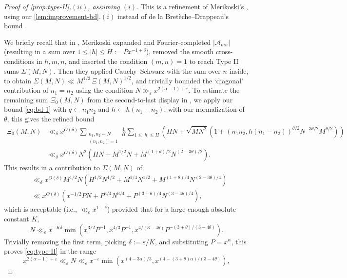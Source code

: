 \documentclass[reqno,11pt]{amsart}
\theoremstyle{remark}
\numberwithin{equation}{section}
\newcommand{\mA}{\mathcal{A}}
\newcommand{\eps}{\varepsilon}
\begin{document}
\begin{proof}[Proof of \cref{prop:type-II}.$(ii)$, assuming $(i)$]
This is a refinement of Merikoski's \cite[Prop.\,4.(ii)]{merikoski2023largest}, using our \cref{lem:improvement-bd}.$(i)$ instead of de la Bret\`eche--Drappeau's bound \cite[(8.5)]{de2020niveau}.

We briefly recall that in \cite[\S 3]{merikoski2023largest}, Merikoski expanded and Fourier-completed $|\mA_{mn}|$ (resulting in a sum over $1 \le |h| \le H := P x^{-1+\delta}$), removed the smooth cross-conditions in $h, m, n$, and inserted the condition $(m, n) = 1$ to reach Type II sums $\Sigma(M, N)$. Then they applied Cauchy--Schwarz with the sum over $n$ inside, to obtain $\Sigma(M, N) \ll M^{1/2}\, \Xi(M, N)^{1/2}$, and trivially bounded the `diagonal' contribution of $n_1 = n_2$ using the condition $N \gg_\eps x^{2(\alpha-1)+\eps}$. To estimate the remaining sum $\Xi_0(M, N)$ from the second-to-last display in \cite[\S 3.10]{merikoski2023largest}, we apply our bound \cref{eq:bd-1} with $q \gets n_1 n_2$ and $h \gets h(n_1 - n_2)$; with our normalization of $\theta$, this gives the refined bound
\[
\begin{aligned}
    \Xi_0(M, N) 
    &\ll_\delta 
    x^{O(\delta)} \sum_{\substack{n_1, n_2 \sim N \\ (n_1, n_2) = 1}} \frac{1}{H} \sum_{1 \le |h| \le H} \left(HN + \sqrt{MN^2} \left(1 + (n_1n_2, h(n_1-n_2))^{\theta/2} N^{-3\theta/2} M^{\theta/2} \right)\right)
    \\
    &\ll_\delta 
    x^{O(\delta)} N^2\left(HN + M^{1/2} N + M^{(1+\theta)/2} N^{(2-3\theta)/2} \right).
\end{aligned}
\]
This results in a contribution to $\Sigma(M, N)$ of
\[
\begin{aligned}
    &\ll_\delta x^{O(\delta)} M^{1/2} N \left(H^{1/2} N^{1/2} + M^{1/4} N^{1/2} + M^{(1+\theta)/4} N^{(2-3\theta)/4} \right)
    \\
    &\ll x^{O(\delta)} \left(x^{-1/2} PN + P^{3/4} N^{3/4}  + P^{(3+\theta)/4} N^{(3-4\theta)/4} \right),
\end{aligned}
\]
which is acceptable (i.e., $\ll_\eps x^{1-\delta}$) provided that for a large enough absolute constant $K$,
\[
    N \ll_\eps x^{-K\delta}
    \min \left(x^{3/2} P^{-1}, x^{4/3} P^{-1}, x^{4/(3-4\theta)} P^{-(3+\theta)/(3-4\theta)}\right).
\]
Trivially removing the first term, picking $\delta := \eps/K$, and substituting $P = x^\alpha$, this proves \cref{eq:type-II} in the range
\[
    x^{2(\alpha-1)+\eps} \ll_\eps N \ll_\eps x^{-\eps}
    \min \left(x^{(4-3\alpha)/3}, x^{(4-(3+\theta)\alpha)/(3-4\theta)} \right),
\]
\end{proof}
\end{document}
